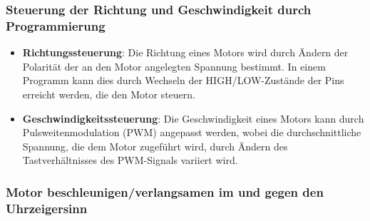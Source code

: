 \documentclass{vorlage-design-main}
\begin{document}
\hypertarget{steuerung-der-richtung-und-geschwindigkeit-durch-programmierung}{%
\subsubsection{Steuerung der Richtung und Geschwindigkeit durch
Programmierung}\label{steuerung-der-richtung-und-geschwindigkeit-durch-programmierung}}

\begin{itemize}

\item
  \textbf{Richtungssteuerung}: Die Richtung eines Motors wird durch
  Ändern der Polarität der an den Motor angelegten Spannung bestimmt. In
  einem Programm kann dies durch Wechseln der HIGH/LOW-Zustände der Pins
  erreicht werden, die den Motor steuern.
\item
  \textbf{Geschwindigkeitssteuerung}: Die Geschwindigkeit eines Motors
  kann durch Pulsweitenmodulation (PWM) angepasst werden, wobei die
  durchschnittliche Spannung, die dem Motor zugeführt wird, durch Ändern
  des Tastverhältnisses des PWM-Signals variiert wird.
\end{itemize}

\newpage

\hypertarget{motor-beschleunigenverlangsamen-im-und-gegen-den-uhrzeigersinn}{%
\subsubsection{Motor beschleunigen/verlangsamen im und gegen den
Uhrzeigersinn}\label{motor-beschleunigenverlangsamen-im-und-gegen-den-uhrzeigersinn}}
\end{document}
